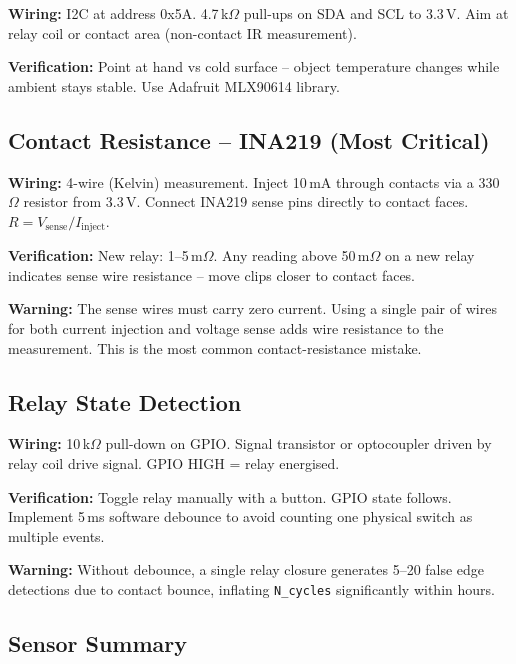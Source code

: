 \documentclass[12pt,a4paper]{article}
\newenvironment{warnbox}{%
  \begin{mdframed}[backgroundcolor=warnbg,linecolor=warnln,linewidth=1.5pt,
    innerleftmargin=9pt,innerrightmargin=9pt,innertopmargin=5pt,innerbottommargin=5pt]
  \textbf{\color{warnln}Warning: }}{\end{mdframed}}
\begin{document}
\textbf{Wiring:} I2C at address 0x5A. 4.7\,k$\Omega$ pull-ups on SDA and SCL to 3.3\,V. Aim at relay coil
or contact area (non-contact IR measurement).

\textbf{Verification:} Point at hand vs cold surface -- object temperature changes while ambient stays stable.
Use Adafruit MLX90614 library.

\subsection{Contact Resistance -- INA219 (Most Critical)}

\textbf{Wiring:} 4-wire (Kelvin) measurement. Inject 10\,mA through contacts via a 330\,$\Omega$ resistor
from 3.3\,V. Connect INA219 sense pins directly to contact faces. $R = V_{\text{sense}} / I_{\text{inject}}$.

\textbf{Verification:} New relay: 1--5\,m$\Omega$. Any reading above 50\,m$\Omega$ on a new relay indicates
sense wire resistance -- move clips closer to contact faces.

\begin{warnbox}
The sense wires must carry zero current. Using a single pair of wires for both current injection and voltage
sense adds wire resistance to the measurement. This is the most common contact-resistance mistake.
\end{warnbox}

\subsection{Relay State Detection}

\textbf{Wiring:} 10\,k$\Omega$ pull-down on GPIO. Signal transistor or optocoupler driven by relay coil drive
signal. GPIO HIGH = relay energised.

\textbf{Verification:} Toggle relay manually with a button. GPIO state follows. Implement 5\,ms software
debounce to avoid counting one physical switch as multiple events.

\begin{warnbox}
Without debounce, a single relay closure generates 5--20 false edge detections due to contact bounce,
inflating \texttt{N\_cycles} significantly within hours.
\end{warnbox}

\subsection{Sensor Summary}
\end{document}
